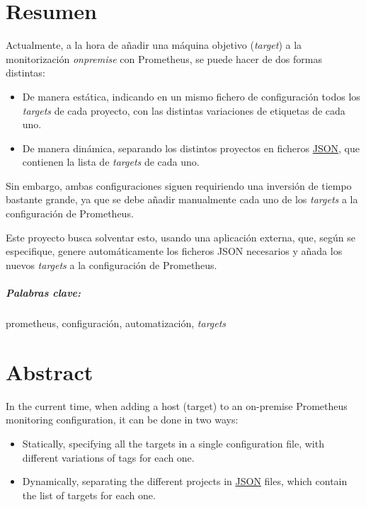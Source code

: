 \chapter*{Resumen}
\label{ch:resumen}

Actualmente, a la hora de añadir una máquina objetivo (\textit{target}) a la monitorización \textit{onpremise} con Prometheus, se puede hacer de dos formas distintas:

\begin{itemize}
  \item De manera estática, indicando en un mismo fichero de configuración todos los \textit{targets} de cada proyecto, con las distintas variaciones de etiquetas de cada uno.
  \item De manera dinámica, separando los distintos proyectos en ficheros \url{JSON}, que contienen la lista de \textit{targets} de cada uno.
\end{itemize}

Sin embargo, ambas configuraciones siguen requiriendo una inversión de tiempo bastante grande, ya que se debe añadir manualmente cada uno de los	\textit{targets} a la configuración de Prometheus.

Este proyecto busca solventar esto, usando una aplicación externa, que, según se especifique, genere automáticamente los ficheros JSON necesarios y añada los nuevos \textit{targets} a la configuración de Prometheus.

\paragraph*{Palabras clave:} prometheus, configuración, automatización,	\textit{targets}


\newpage
    
\chapter*{Abstract}
\label{ch:abstract}
In the current time, when adding a host (target) to an on-premise Prometheus monitoring configuration, it can be done in two ways:
\begin{itemize}
  \item Statically, specifying all the targets in a single configuration file, with different variations of tags for each one.
  \item Dynamically, separating the different projects in \url{JSON} files, which contain the list of	targets for each one.
\end{itemize}


